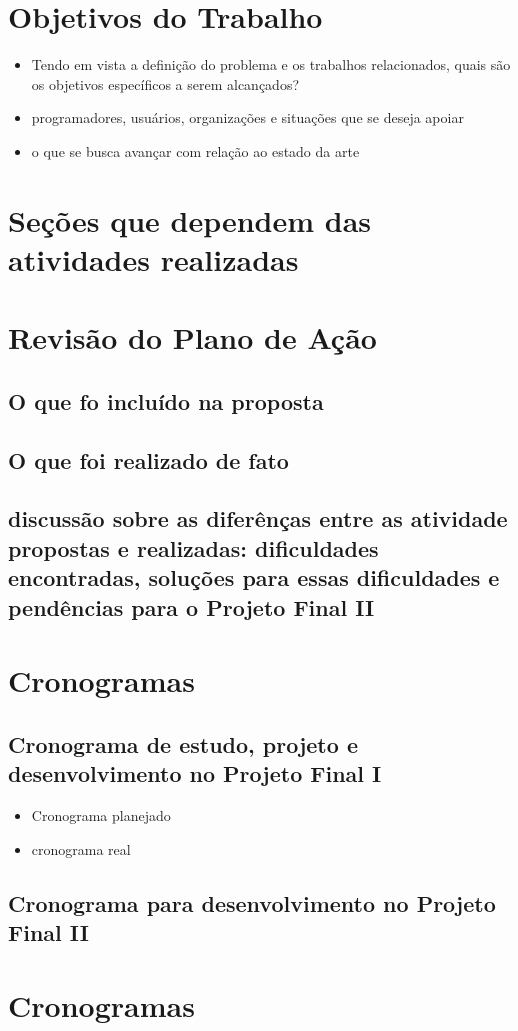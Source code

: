 \documentclass[
  dissertacao,
  brazil
]{ThesisPUC}
\begin{document}
\chapter{Objetivos do Trabalho}
\begin{itemize}
    \item Tendo em vista a definição do problema e os trabalhos relacionados, quais são os objetivos específicos a serem alcançados?
    \item programadores, usuários, organizações e situações que se deseja apoiar
    \item o que se busca avançar com relação ao estado da arte
\end{itemize}

\chapter{Seções que dependem das atividades realizadas}

\chapter{Revisão do Plano de Ação}
\section{O que fo incluído na proposta}
\section{O que foi realizado de fato}
\section{discussão sobre as diferênças entre as atividade propostas e realizadas: dificuldades encontradas, soluções para essas dificuldades e pendências para o Projeto Final II}

\chapter{Cronogramas}
\section{Cronograma de estudo, projeto e desenvolvimento no Projeto Final I}
\begin{itemize}
    \item Cronograma planejado
    \item cronograma real
\end{itemize}
\section{Cronograma para desenvolvimento no Projeto Final II}

\chapter{Cronogramas}


\arial

\normalfont
\end{document}
